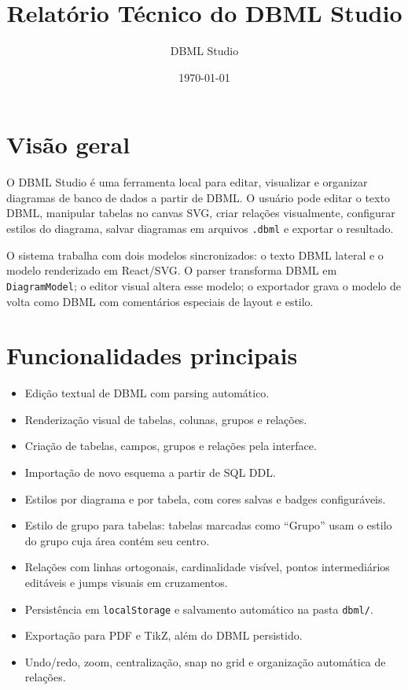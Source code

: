 \documentclass[11pt,a4paper]{article}
\title{Relatório Técnico do DBML Studio}
\author{DBML Studio}
\date{\today}
\begin{document}
\maketitle

\section{Visão geral}

O DBML Studio é uma ferramenta local para editar, visualizar e organizar diagramas de banco de dados a partir de DBML. O usuário pode editar o texto DBML, manipular tabelas no canvas SVG, criar relações visualmente, configurar estilos do diagrama, salvar diagramas em arquivos \texttt{.dbml} e exportar o resultado.

O sistema trabalha com dois modelos sincronizados: o texto DBML lateral e o modelo renderizado em React/SVG. O parser transforma DBML em \texttt{DiagramModel}; o editor visual altera esse modelo; o exportador grava o modelo de volta como DBML com comentários especiais de layout e estilo.

\section{Funcionalidades principais}

\begin{itemize}
  \item Edição textual de DBML com parsing automático.
  \item Renderização visual de tabelas, colunas, grupos e relações.
  \item Criação de tabelas, campos, grupos e relações pela interface.
  \item Importação de novo esquema a partir de SQL DDL.
  \item Estilos por diagrama e por tabela, com cores salvas e badges configuráveis.
  \item Estilo de grupo para tabelas: tabelas marcadas como ``Grupo'' usam o estilo do grupo cuja área contém seu centro.
  \item Relações com linhas ortogonais, cardinalidade visível, pontos intermediários editáveis e jumps visuais em cruzamentos.
  \item Persistência em \texttt{localStorage} e salvamento automático na pasta \texttt{dbml/}.
  \item Exportação para PDF e TikZ, além do DBML persistido.
  \item Undo/redo, zoom, centralização, snap no grid e organização automática de relações.
\end{itemize}
\end{document}
